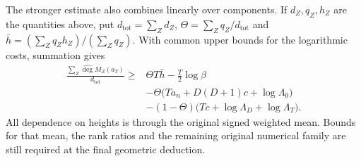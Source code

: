 The stronger estimate also combines linearly over components.
If $d_Z,q_Z,h_Z$ are the quantities above, put
$d_{\mathrm{tot}}=\sum_Zd_Z$,
$\Theta=\sum_Zq_Z/d_{\mathrm{tot}}$ and
$\bar h=(\sum_Zq_Zh_Z)/(\sum_Zq_Z)$.
With common upper bounds for the logarithmic costs, summation gives
\[
\begin{split}
\frac{\sum_Z\widehat{\deg}M_Z(a_T)}{d_{\mathrm{tot}}}
\ge{}&\Theta T\bar h-\frac T2\log\beta\\
&-\Theta\bigl(Ta_n+D(D+1)c+\log\Lambda_0\bigr)\\
&-(1-\Theta)\bigl(Tc+\log\Lambda_D+\log\Lambda_T\bigr).
\end{split}
\]
All dependence on heights is through the original signed weighted
mean.  Bounds for that mean, the rank ratios and the remaining
original numerical family are still required at the final
geometric deduction.
